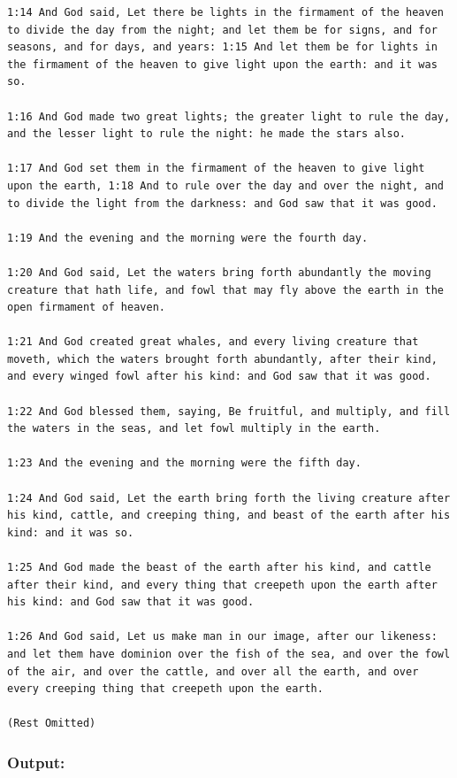 \documentclass[11pt]{article}
\begin{document}
\begin{lstlisting}
1:14 And God said, Let there be lights in the firmament of the heaven
to divide the day from the night; and let them be for signs, and for
seasons, and for days, and years: 1:15 And let them be for lights in
the firmament of the heaven to give light upon the earth: and it was
so.

1:16 And God made two great lights; the greater light to rule the day,
and the lesser light to rule the night: he made the stars also.

1:17 And God set them in the firmament of the heaven to give light
upon the earth, 1:18 And to rule over the day and over the night, and
to divide the light from the darkness: and God saw that it was good.

1:19 And the evening and the morning were the fourth day.

1:20 And God said, Let the waters bring forth abundantly the moving
creature that hath life, and fowl that may fly above the earth in the
open firmament of heaven.

1:21 And God created great whales, and every living creature that
moveth, which the waters brought forth abundantly, after their kind,
and every winged fowl after his kind: and God saw that it was good.

1:22 And God blessed them, saying, Be fruitful, and multiply, and fill
the waters in the seas, and let fowl multiply in the earth.

1:23 And the evening and the morning were the fifth day.

1:24 And God said, Let the earth bring forth the living creature after
his kind, cattle, and creeping thing, and beast of the earth after his
kind: and it was so.

1:25 And God made the beast of the earth after his kind, and cattle
after their kind, and every thing that creepeth upon the earth after
his kind: and God saw that it was good.

1:26 And God said, Let us make man in our image, after our likeness:
and let them have dominion over the fish of the sea, and over the fowl
of the air, and over the cattle, and over all the earth, and over
every creeping thing that creepeth upon the earth.

(Rest Omitted)

\end{lstlisting}

\subsubsection*{Output:}
\end{document}
